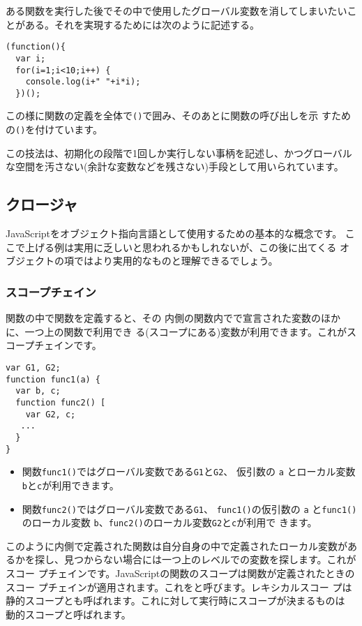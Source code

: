 ある関数を実行した後でその中で使用したグローバル変数を消してしまいたいこ
とがある。それを実現するためには次のように記述する。
\begin{Verbatim}
(function(){
  var i;
  for(i=1;i<10;i++) {
    console.log(i+" "+i*i);
  })();
\end{Verbatim}
この様に関数の定義を全体で\verb+()+で囲み、そのあとに関数の呼び出しを示
すための\verb+()+を付けています。

この技法は、初期化の段階で1回しか実行しない事柄を記述し、かつグローバル
な空間を汚さない(余計な変数などを残さない)手段として用いられています。
\iffalse
\subsubsection{関数を返す関数}
関数もデータなので、ある関数の戻り値として関数自体を返すことも可能です。
この使用法の例として、ある処理がブラウザごとに異なる作業を必要とするとき
に、それに適応した判定を1回だけしてあとは戻した関数を実行するだけにする
ようにできます。
\fi
\subsection{クロージャ}
JavaScriptをオブジェクト指向言語として使用するための基本的な概念です。
ここで上げる例は実用に乏しいと思われるかもしれないが、この後に出てくる
オブジェクトの項ではより実用的なものと理解できるでしょう。
\subsubsection{スコープチェイン}
関数の中で関数を定義すると、その
内側の関数内でで宣言された変数のほかに、一つ上の関数で利用でき
る(スコープにある)変数が利用できます。これがスコープチェインです。
\begin{Verbatim}
var G1, G2;
function func1(a) {
  var b, c;
  function func2() [
    var G2, c;
   ...
  }
}
\end{Verbatim}
\begin{itemize}
 \item 関数\verb+func1()+ではグローバル変数である\verb+G1+と\verb+G2+、
       仮引数の \verb+a+ とローカル変数\verb+b+と\verb+c+が利用できます。
 \item 関数\verb+func2()+ではグローバル変数である\verb+G1+、
       \verb+func1()+の仮引数の \verb+a+ と\verb+func1()+のローカル変数
       \verb+b+、\verb+func2()+のローカル変数\verb+G2+と\verb+c+が利用で
       きます。
\end{itemize}
このように内側で定義された関数は自分自身の中で定義されたローカル変数があ
るかを探し、見つからない場合には一つ上のレベルでの変数を探します。これがスコー
プチェインです。JavaScriptの関数のスコープは関数が定義されたときのスコー
プチェインが適用されます。これをと呼びます。レキシカルスコー
プは静的スコープとも呼ばれます。これに対して実行時にスコープが決まるものは
動的スコープと呼ばれます。
